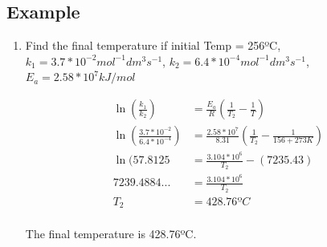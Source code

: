 \documentclass{article}
\begin{document}
\subsection{Example}
\begin{enumerate}
\item Find the final temperature if initial Temp = 256ºC, $k_{1} = 3.7*10^{-2}mol^{-1}dm^{3}s^{-1}$, $k_{2} = 6.4*10^{-4}mol^{-1}dm^{3}s^{-1}$, $E_{a} = 2.58 * 10^{7}kJ/mol$

\begin{align*}
\ln{(\frac{k_{1}}{k_{2}})}  &= \frac{E_{a}}{R}(\frac{1}{T_{2}} - \frac{1}{T})\\
\ln{(\frac{3.7*10^{-2}}{6.4*10^{-4}})} &= \frac{2.58*10^{7}}{8.31}(\frac{1}{T_{2}} - \frac{1}{156 + 273 K})\\
\ln{(57.8125} &= \frac{3.104*10^6}{T_{2}} - (7235.43)\\
7239.4884... &= \frac{3.104*10^6}{T_{2}}\\
T_{2} &= 428.76ºC
\end{align*}\\
The final temperature is 428.76ºC.

\end{enumerate}
\end{document}
